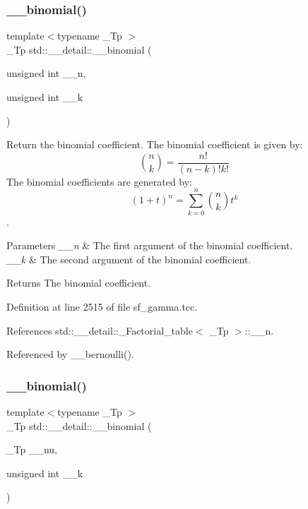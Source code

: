 \subsubsection{\texorpdfstring{\+\_\+\+\_\+binomial()}{\_\_binomial()}\hspace{0.1cm}{\footnotesize\ttfamily [1/2]}}
{\footnotesize\ttfamily template$<$typename \+\_\+\+Tp $>$ \\
\+\_\+\+Tp std\+::\+\_\+\+\_\+detail\+::\+\_\+\+\_\+binomial (\begin{DoxyParamCaption}\item[{unsigned int}]{\+\_\+\+\_\+n,  }\item[{unsigned int}]{\+\_\+\+\_\+k }\end{DoxyParamCaption})}



Return the binomial coefficient. The binomial coefficient is given by\+: \[ \binom{n}{k} = \frac{n!}{(n-k)! k!} \] The binomial coefficients are generated by\+: \[ \left(1 + t\right)^n = \sum_{k=0}^n \binom{n}{k} t^k \]. 


\begin{DoxyParams}{Parameters}
{\em \+\_\+\+\_\+n} & The first argument of the binomial coefficient. \\
\hline
{\em \+\_\+\+\_\+k} & The second argument of the binomial coefficient. \\
\hline
\end{DoxyParams}
\begin{DoxyReturn}{Returns}
The binomial coefficient. 
\end{DoxyReturn}


Definition at line 2515 of file sf\+\_\+gamma.\+tcc.



References std\+::\+\_\+\+\_\+detail\+::\+\_\+\+Factorial\+\_\+table$<$ \+\_\+\+Tp $>$\+::\+\_\+\+\_\+n.



Referenced by \+\_\+\+\_\+bernoulli().

\mbox{\label{namespacestd_1_1____detail_a9ac7d44eebfe3e1a3fb5ebbd9c08bd55}} 
\subsubsection{\texorpdfstring{\+\_\+\+\_\+binomial()}{\_\_binomial()}\hspace{0.1cm}{\footnotesize\ttfamily [2/2]}}
{\footnotesize\ttfamily template$<$typename \+\_\+\+Tp $>$ \\
\+\_\+\+Tp std\+::\+\_\+\+\_\+detail\+::\+\_\+\+\_\+binomial (\begin{DoxyParamCaption}\item[{\+\_\+\+Tp}]{\+\_\+\+\_\+nu,  }\item[{unsigned int}]{\+\_\+\+\_\+k }\end{DoxyParamCaption})}



